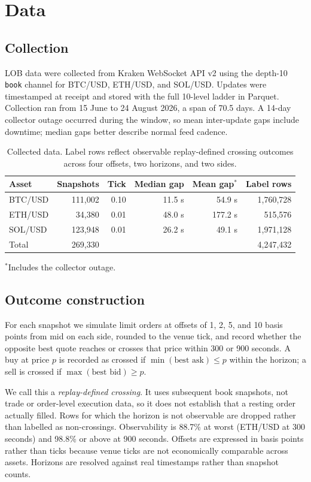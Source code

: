 \documentclass[11pt]{article}
\begin{document}
\section{Data}
\subsection{Collection}
LOB data were collected from Kraken WebSocket API v2 using the depth-10 \texttt{book} channel for BTC/USD, ETH/USD, and SOL/USD. Updates were timestamped at receipt and stored with the full 10-level ladder in Parquet. Collection ran from 15 June to 24 August 2026, a span of 70.5 days. A 14-day collector outage occurred during the window, so mean inter-update gaps include downtime; median gaps better describe normal feed cadence.

\begin{table}[ht]
\centering
\caption{Collected data. Label rows reflect observable replay-defined crossing outcomes across four offsets, two horizons, and two sides.}
\begin{tabular}{lrrrrr}
\toprule
Asset & Snapshots & Tick & Median gap & Mean gap$^{*}$ & Label rows \\
\midrule
BTC/USD & 111,002 & 0.10 & 11.5 s & 54.9 s & 1,760,728 \\
ETH/USD & 34,380 & 0.01 & 48.0 s & 177.2 s & 515,576 \\
SOL/USD & 123,948 & 0.01 & 26.2 s & 49.1 s & 1,971,128 \\
\midrule
Total & 269,330 & & & & 4,247,432 \\
\bottomrule
\end{tabular}

\smallskip
{\footnotesize $^{*}$Includes the collector outage.}
\end{table}

\subsection{Outcome construction}
For each snapshot we simulate limit orders at offsets of 1, 2, 5, and 10 basis points from mid on each side, rounded to the venue tick, and record whether the opposite best quote reaches or crosses that price within 300 or 900 seconds. A buy at price $p$ is recorded as crossed if $\min(\text{best ask})\le p$ within the horizon; a sell is crossed if $\max(\text{best bid})\ge p$.

We call this a \emph{replay-defined crossing}. It uses subsequent book snapshots, not trade or order-level execution data, so it does not establish that a resting order actually filled. Rows for which the horizon is not observable are dropped rather than labelled as non-crossings. Observability is 88.7\% at worst (ETH/USD at 300 seconds) and 98.8\% or above at 900 seconds. Offsets are expressed in basis points rather than ticks because venue ticks are not economically comparable across assets. Horizons are resolved against real timestamps rather than snapshot counts.
\end{document}
